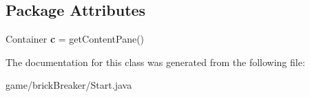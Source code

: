 \subsection*{Package Attributes}
\begin{DoxyCompactItemize}
\item 
\hypertarget{classbrick_breaker_1_1_start_aa694e353f91972cfe69ffb36d09cdab9}{
Container {\bfseries c} = getContentPane()}
\label{classbrick_breaker_1_1_start_aa694e353f91972cfe69ffb36d09cdab9}

\end{DoxyCompactItemize}


The documentation for this class was generated from the following file:\begin{DoxyCompactItemize}
\item 
game/brickBreaker/Start.java\end{DoxyCompactItemize}
